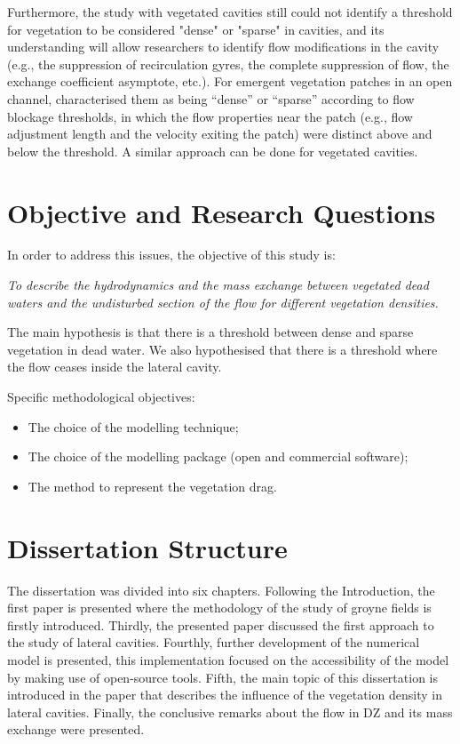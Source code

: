 Furthermore, the study with vegetated cavities still could not identify a threshold for vegetation to be considered "dense" or "sparse" in cavities, and its understanding will allow researchers to identify flow modifications in the cavity (e.g., the suppression of recirculation gyres, the complete suppression of flow, the exchange coefficient asymptote, etc.).  For emergent vegetation patches in an open channel, \textcite{chen2012} characterised them as being “dense” or “sparse” according to flow blockage thresholds, in which the flow properties near the patch (e.g., flow adjustment length and the velocity exiting the patch) were distinct above and below the threshold. A similar approach can be done for vegetated cavities. 
\section{Objective and Research Questions}
In order to address this issues, the objective of this study is:

\textit{To describe the hydrodynamics and the mass exchange between vegetated dead waters and
the undisturbed section of the flow for different vegetation densities.}

The main hypothesis is that there is a threshold between dense and sparse vegetation in dead water. We also hypothesised that there is a threshold where the flow ceases inside the lateral cavity. 

Specific methodological objectives:
\begin{itemize}[noitemsep,topsep=0pt,align=left,itemindent=\parindent]
    \item The choice of the modelling technique;
    \item The choice of the modelling package (open and commercial software);
    \item The method to represent the vegetation drag.
\end{itemize}

\section{Dissertation Structure}
The dissertation was divided into six chapters. Following the Introduction, the first paper is presented where the methodology of the study of groyne fields is firstly introduced. Thirdly, the presented paper discussed the first approach to the study of lateral cavities. Fourthly, further development of the numerical model is presented, this implementation focused on the accessibility of the model by making use of open-source tools. Fifth, the main topic of this dissertation is introduced in the paper that describes the influence of the vegetation density in lateral cavities. Finally, the conclusive remarks about the flow in DZ and its mass exchange were presented.

